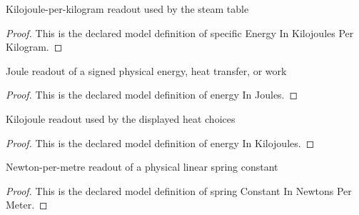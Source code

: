 \begin{definition}
  \label{def:physics:phyx-mini-0452:phyxminiproblems-problemphyxmini0452-specificenergyinkilojoulesperkilogram}
  Kilojoule-per-kilogram readout used by the steam table
\end{definition}
\begin{proof}
  This is the declared model definition of specific Energy In Kilojoules Per Kilogram.
\end{proof}
\begin{definition}
  \label{def:physics:phyx-mini-0452:phyxminiproblems-problemphyxmini0452-energyinjoules}
  Joule readout of a signed physical energy, heat transfer, or work
\end{definition}
\begin{proof}
  This is the declared model definition of energy In Joules.
\end{proof}
\begin{definition}
  \label{def:physics:phyx-mini-0452:phyxminiproblems-problemphyxmini0452-energyinkilojoules}
  Kilojoule readout used by the displayed heat choices
\end{definition}
\begin{proof}
  This is the declared model definition of energy In Kilojoules.
\end{proof}
\begin{definition}
  \label{def:physics:phyx-mini-0452:phyxminiproblems-problemphyxmini0452-springconstantinnewtonspermeter}
  Newton-per-metre readout of a physical linear spring constant
\end{definition}
\begin{proof}
  This is the declared model definition of spring Constant In Newtons Per Meter.
\end{proof}
